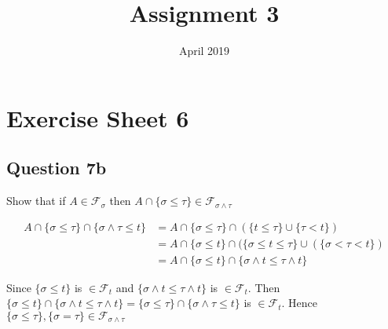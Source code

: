 \documentclass[answers]{exam}
\title{Assignment 3}
\date{April 2019}
\begin{document}
	

\section*{Exercise Sheet 6}

\subsection*{Question 7b}

Show that if $A \in \mathcal{F}_\sigma$ then $A \cap \{\sigma \leq \tau\} \in \mathcal{F}_{\sigma \land \tau}$

\begin{solution}
	
	\begin{align*}
	A \cap \{\sigma \leq \tau \} \cap \{\sigma \land \tau \leq t \} 
	&= A \cap \{\sigma \leq \tau \} \cap (\{t \leq \tau \} \cup \{\tau < t \} )\\
	&= A \cap \{ \sigma \leq t\} \cap (\{ \sigma \leq t \leq \tau\} \cup (\{ \sigma < \tau < t\}) \\
	&=A \cap \{ \sigma \leq t\} \cap \{ \sigma \land t \leq \tau \land t \}
	\end{align*}
	
	Since $\{ \sigma \leq t\}$ is $ \in \mathcal{F}_t$ and $\{ \sigma \land t \leq \tau \land t \}$ is $ \in \mathcal{F}_t$. Then $\{ \sigma \leq t\} \cap \{ \sigma \land t \leq \tau \land t \} = \{\sigma \leq \tau \} \cap \{\sigma \land \tau \leq t \}$ is $ \in \mathcal{F}_t  $. Hence $\{\sigma \leq \tau \},\{\sigma = \tau \} \in \mathcal{F}_{\sigma \land \tau}$ 
	
\end{solution}
 
\end{document}
